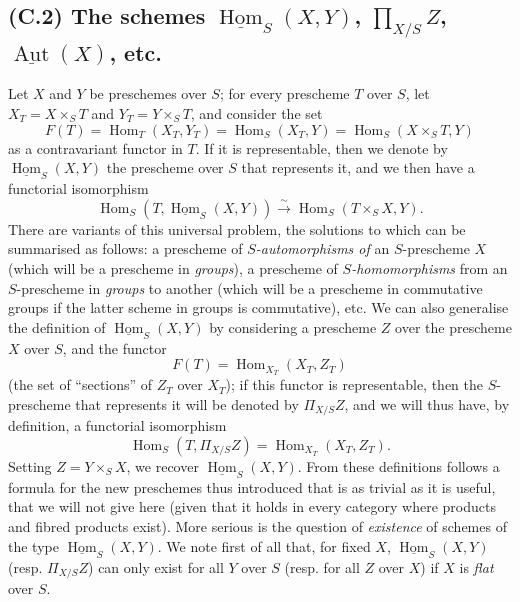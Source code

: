 \documentclass{article}
\newcommand{\oldpage}[1]{\marginpar{\footnotesize$\Big\vert$ \textit{p.~#1}}}
\theoremstyle{definition}
\theoremstyle{definition}
\theoremstyle{definition}
\theoremstyle{definition}
\theoremstyle{remark}
\begin{document}
\hypertarget{fga-3-ii-section-C.2}{%
\subsection{\texorpdfstring{(C.2) The schemes \(\underline{\operatorname{Hom}}_S(X,Y)\), \(\prod_{X/S}Z\), \(\underline{\operatorname{Aut}}(X)\), etc.}{(C.2) The schemes \textbackslash underline\{\textbackslash operatorname\{Hom\}\}\_S(X,Y), \textbackslash prod\_\{X/S\}Z, \textbackslash underline\{\textbackslash operatorname\{Aut\}\}(X), etc.}}\label{fga-3-ii-section-C.2}}

Let \(X\) and \(Y\) be preschemes over \(S\);
\oldpage{195-13}for every prescheme \(T\) over \(S\), let \(X_T=X\times_S T\) and \(Y_T=Y\times_S T\), and consider the set
\[
  F(T)
  = \operatorname{Hom}_T(X_T,Y_T)
  = \operatorname{Hom}_S(X_T,Y)
  = \operatorname{Hom}_S(X\times_S T,Y)
\]
as a contravariant functor in \(T\).
If it is representable, then we denote by \(\underline{\operatorname{Hom}}_S(X,Y)\) the prescheme over \(S\) that represents it, and we then have a functorial isomorphism
\[
  \operatorname{Hom}_S(T,\underline{\operatorname{Hom}}_S(X,Y)) \xrightarrow{\sim}\operatorname{Hom}_S(T\times_S X,Y).
\]
There are variants of this universal problem, the solutions to which can be summarised as follows: a prescheme of \emph{\(S\)-automorphisms of} an \(S\)-prescheme \(X\) (which will be a prescheme in \emph{groups}), a prescheme of \emph{\(S\)-homomorphisms} from an \(S\)-prescheme in \emph{groups} to another (which will be a prescheme in commutative groups if the latter scheme in groups is commutative), etc.
We can also generalise the definition of \(\underline{\operatorname{Hom}}_S(X,Y)\) by considering a prescheme \(Z\) over the prescheme \(X\) over \(S\), and the functor
\[
  F(T) = \operatorname{Hom}_{X_T}(X_T,Z_T)
\]
(the set of ``sections'' of \(Z_T\) over \(X_T\));
if this functor is representable, then the \(S\)-prescheme that represents it will be denoted by \(\Pi_{X/S}Z\), and we will thus have, by definition, a functorial isomorphism
\[
  \operatorname{Hom}_S(T,\Pi_{X/S}Z) = \operatorname{Hom}_{X_T}(X_T,Z_T).
\]
Setting \(Z=Y\times_S X\), we recover \(\underline{\operatorname{Hom}}_S(X,Y)\).
From these definitions follows a formula for the new preschemes thus introduced that is as trivial as it is useful, that we will not give here (given that it holds in every category where products and fibred products exist).
More serious is the question of \emph{existence} of schemes of the type \(\underline{\operatorname{Hom}}_S(X,Y)\).
We note first of all that, for fixed \(X\), \(\underline{\operatorname{Hom}}_S(X,Y)\) (resp. \(\Pi_{X/S}Z\)) can only exist for all \(Y\) over \(S\) (resp. for all \(Z\) over \(X\)) if \(X\) is \emph{flat} over \(S\).
\end{document}
